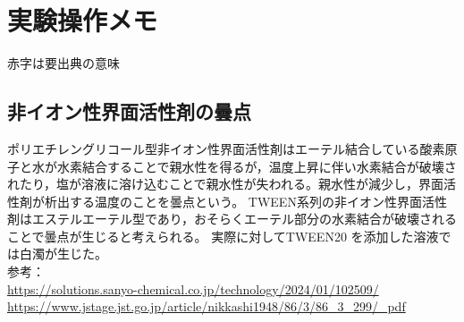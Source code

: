 \documentclass{ltjsarticle}
\begin{document}
\section{実験操作メモ}
赤字は要出典の意味
\subsection{非イオン性界面活性剤の曇点}
ポリエチレングリコール型非イオン性界面活性剤はエーテル結合している酸素原子と水が水素結合することで親水性を得るが，温度上昇に伴い水素結合が破壊されたり，塩が溶液に溶け込むことで親水性が失われる。親水性が減少し，界面活性剤が析出する温度のことを曇点という。
TWEEN系列の非イオン性界面活性剤はエステルエーテル型であり，おそらくエーテル部分の水素結合が破壊されることで曇点が生じると考えられる。
実際に対してTWEEN20  を添加した溶液では白濁が生じた。\\
参考：\\
\url{https://solutions.sanyo-chemical.co.jp/technology/2024/01/102509/}\\
\url{https://www.jstage.jst.go.jp/article/nikkashi1948/86/3/86_3_299/_pdf}
\end{document}
